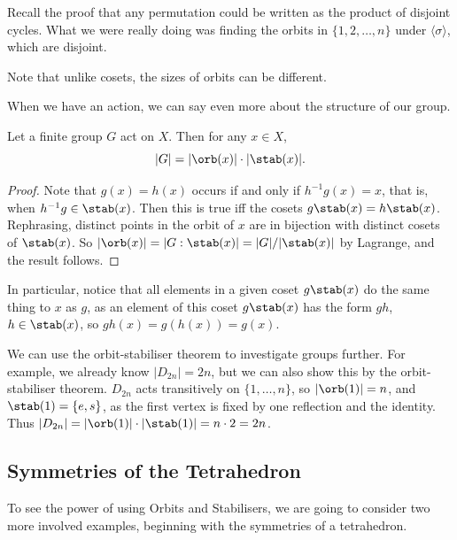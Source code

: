 \documentclass[a4]{scrreprt}
\newcommand{\newsubsection}{\subsection}
\begin{document}
Recall the proof that any permutation could be written as the product of disjoint cycles. What we were really doing was finding the orbits in $\{1, 2, \dots, n\}$ under $\langle \sigma \rangle$, which are disjoint.

\begin{remark}
	Note that unlike cosets, the sizes of orbits can be different.
\end{remark}

When we have an action, we can say even more about the structure of our group.

\begin{theorem}
	Let a finite group $G$ act on $X$. Then for any $x \in X$,
	$$
	|G| = |\orb(x)| \cdot |\stab(x)|.
	$$
\end{theorem}
\begin{proof}
	Note that $g(x) = h(x)$ occurs if and only if $h^{-1} g (x) = x$, that is, when $h^{-1} g \in \stab(x)$. Then this is true iff the cosets $g \stab(x) = h\stab(x)$. Rephrasing, distinct points in the orbit of $x$ are in bijection with distinct cosets of $\stab(x)$. So $|\orb(x)| = |G : \stab(x)| = |G| / |\stab(x) |$ by Lagrange, and the result follows.
\end{proof}

In particular, notice that all elements in a given coset $g \stab(x)$ do the same thing to $x$ as $g$, as an element of this coset $g\stab(x)$ has the form $gh$, $h \in \stab(x)$, so $gh(x) = g(h(x)) = g(x)$.

We can use the orbit-stabiliser theorem to investigate groups further. For example, we already know $|D_{2n}| = 2n$, but we can also show this by the orbit-stabiliser theorem. $D_{2n}$ acts transitively on $\{1, \dots, n\}$, so $|\orb(1)| = n$, and $\stab(1) = \{e, s\}$, as the first vertex is fixed by one reflection and the identity. Thus $|D_{2n}| = |\orb(1)| \cdot |\stab(1)| = n \cdot 2 = 2n$.


\newsubsection{Symmetries of the Tetrahedron}

To see the power of using Orbits and Stabilisers, we are going to consider two more involved examples, beginning with the symmetries of a tetrahedron.
\end{document}
